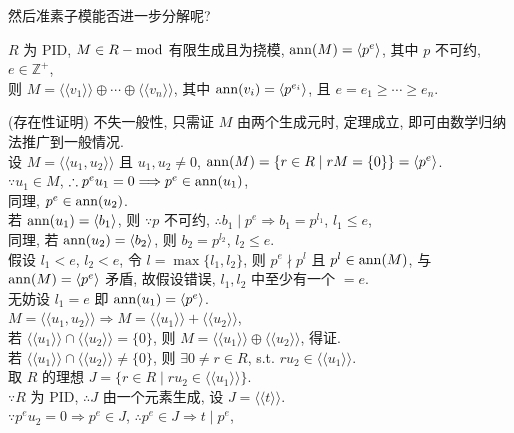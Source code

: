 \documentclass{note}
\begin{document}
然后准素子模能否进一步分解呢?

\begin{thm}[(课本定理 6.11)]\label{thm-6.11}
    $R$ 为 PID, $M\in R-\operatorname{mod}$ 有限生成且为挠模, $\operatorname{ann}(M)=\langle p^e\rangle$, 其中 $p$ 不可约, $e\in\mathbb{Z}^+$,\\
    则 $M=\langle\langle v_1\rangle\rangle\oplus\cdots\oplus\langle\langle v_n\rangle\rangle$, 其中 $\operatorname{ann}(v_i)=\langle p^{e_i}\rangle$, 且 $e=e_1\geq\cdots\geq e_n$.
\end{thm}
\begin{pf}(存在性证明)
    不失一般性, 只需证 $M$ 由两个生成元时, 定理成立, 即可由数学归纳法推广到一般情况.\\
    设 $M=\langle\langle u_1,u_2\rangle\rangle$ 且 $u_1,u_2\neq 0$, $\operatorname{ann}(M)=\{r\in R\mid rM=\{0\}\}=\langle p^e\rangle$.\\
    $\because u_1\in M$, $\therefore p^eu_1=0\Longrightarrow p^e\in\operatorname{ann}(u_1)$,\\
    同理, $p^e\in\operatorname{ann}(u_2)$.\\
    若 $\operatorname{ann}(u_1)=\langle b_1\rangle$, 则 $\because p$ 不可约, $\therefore b_1\mid p^e\Longrightarrow b_1=p^{l_1}$, $l_1\leq e$,\\
    同理, 若 $\operatorname{ann}(u_2)=\langle b_2\rangle$, 则 $b_2=p^{l_2}$, $l_2\leq e$.\\
    假设 $l_1<e$, $l_2<e$, 令 $l=\max\{l_1,l_2\}$, 则 $p^e\nmid p^l$ 且 $p^l\in\operatorname{ann}(M)$, 与 $\operatorname{ann}(M)=\langle p^e\rangle$ 矛盾, 故假设错误, $l_1,l_2$ 中至少有一个 $=e$.\\
    无妨设 $l_1=e$ 即 $\operatorname{ann}(u_1)=\langle p^e\rangle$.\\
    $M=\langle\langle u_1,u_2\rangle\rangle\Longrightarrow M=\langle\langle u_1\rangle\rangle+\langle\langle u_2\rangle\rangle$,\\
    若 $\langle\langle u_1\rangle\rangle\cap\langle\langle u_2\rangle\rangle=\{0\}$, 则 $M=\langle\langle u_1\rangle\rangle\oplus\langle\langle u_2\rangle\rangle$, 得证.\\
    若 $\langle\langle u_1\rangle\rangle\cap\langle\langle u_2\rangle\rangle\neq\{0\}$, 则 $\exists 0\neq r\in R$, s.t. $ru_2\in\langle\langle u_1\rangle\rangle$.\\
    取 $R$ 的理想 $J=\{r\in R\mid ru_2\in\langle\langle u_1\rangle\rangle\}$.\\
    $\because R$ 为 PID, $\therefore J$ 由一个元素生成, 设 $J=\langle\langle t\rangle\rangle$.\\
    $\because p^eu_2=0\Longrightarrow p^e\in J$, $\therefore p^e\in J\Longrightarrow t\mid p^e$,\\

\end{pf}
\end{document}
